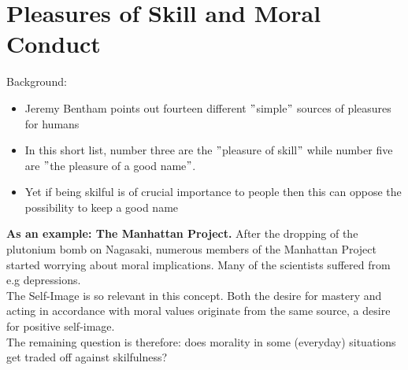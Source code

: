 
\section{Pleasures of Skill and Moral Conduct}

Background:
\begin{itemize}
	\item Jeremy Bentham points out fourteen different $"$simple$"$ sources of pleasures for humans
	\item In this short list, number three are the $"$pleasure of skill$"$ while number five are $"$the pleasure of a good name$"$.
	\item Yet if being skilful is of crucial importance to people then this can oppose the possibility to keep a good name
\end{itemize}
  
  
  
\textbf{As an example: The Manhattan Project.} After the dropping of the plutonium bomb on Nagasaki, numerous members of the Manhattan Project started worrying about moral implications. Many of the scientists suffered from e.g depressions. \\ 

The Self-Image is so relevant in this concept. Both the desire for mastery and acting in accordance with moral values originate from the same source, a desire for positive self-image. \\ 

The remaining question is therefore: does morality in some (everyday) situations get traded off against skilfulness?

\newpage